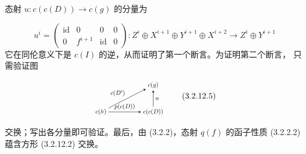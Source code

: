 态射 $u\colon c(c(D))\longrightarrow c(g)$ 的分量为

\begin{equation}
  u^i=
  \begin{pmatrix}
    \operatorname{id}&0&0&0\\
    0&f^{i+1}&\operatorname{id}&0
  \end{pmatrix}
  \colon Z^i\oplus X^{i+1}\oplus Y^{i+1}\oplus X^{i+2}
  \longrightarrow Z^i\oplus Y^{i+1}
  \tag{3.2.12.4}
\end{equation}
它在同伦意义下是 $c(I)$ 的逆，从而证明了第一个断言。为证明第二个断言，
只需验证图

\begin{equation}
  \begin{tikzpicture}[>=stealth,baseline=(current bounding box.center),scale=0.74,
    every node/.style={transform shape}]
    \node (Ch) at (0,0) {$c(h)$};
    \node (Cg) at (3.0,1.55) {$c(g)$};
    \node (CcD) at (3.0,0) {$c(c(D))$};
    \draw[->] (Ch) -- node[above left] {$c(D')$} (Cg);
    \draw[->] (CcD) -- node[right] {$u$} (Cg);
    \draw[->] (Ch) -- node[above] {$p(c(D))$} (CcD);
  \end{tikzpicture}
  \tag{3.2.12.5}
\end{equation}

交换；写出各分量即可验证。最后，由 (3.2.2)，态射 $q(f)$ 的函子性质
(3.2.2.2) 蕴含方形 (3.2.12.2) 交换。
\endgroup
